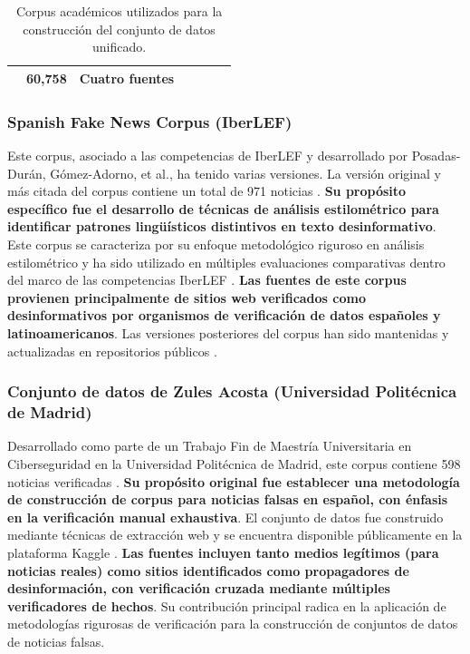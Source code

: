 \begin{table}[htbp]
{\begin{tabular}{|c|l|l|c|c|l|c|}
\hline
\rowcolor{UAMAzcapo!20}
\multicolumn{5}{|c|}{\textbf{TOTAL CORPUS ACADÉMICOS}} & \textbf{60,758} & \textbf{Cuatro fuentes} \\
\hline
\end{tabular}
}
\caption{Corpus académicos utilizados para la construcción del conjunto de datos unificado.}
\label{tab:corpus_academicos}
\end{table}

\subsubsection{Spanish Fake News Corpus (IberLEF)}

Este corpus, asociado a las competencias de IberLEF y desarrollado por Posadas-Durán, Gómez-Adorno, et al., ha tenido varias versiones. La versión original y más citada del corpus contiene un total de 971 noticias \cite{posadas2019detection}. \textbf{Su propósito específico fue el desarrollo de técnicas de análisis estilométrico para identificar patrones lingüísticos distintivos en texto desinformativo}. Este corpus se caracteriza por su enfoque metodológico riguroso en análisis estilométrico y ha sido utilizado en múltiples evaluaciones comparativas dentro del marco de las competencias IberLEF \cite{gomez2021overview, aragon2020overview}. \textbf{Las fuentes de este corpus provienen principalmente de sitios web verificados como desinformativos por organismos de verificación de datos españoles y latinoamericanos}. Las versiones posteriores del corpus han sido mantenidas y actualizadas en repositorios públicos \cite{ramirez2021spanish}.

\subsubsection{Conjunto de datos de Zules Acosta (Universidad Politécnica de Madrid)}

Desarrollado como parte de un Trabajo Fin de Maestría Universitaria en Ciberseguridad en la Universidad Politécnica de Madrid, este corpus contiene 598 noticias verificadas \cite{acosta2019construccion}. \textbf{Su propósito original fue establecer una metodología de construcción de corpus para noticias falsas en español, con énfasis en la verificación manual exhaustiva}. El conjunto de datos fue construido mediante técnicas de extracción web y se encuentra disponible públicamente en la plataforma Kaggle \cite{acosta2019dataset, zules2019spanish}. \textbf{Las fuentes incluyen tanto medios legítimos (para noticias reales) como sitios identificados como propagadores de desinformación, con verificación cruzada mediante múltiples verificadores de hechos}. Su contribución principal radica en la aplicación de metodologías rigurosas de verificación para la construcción de conjuntos de datos de noticias falsas.

